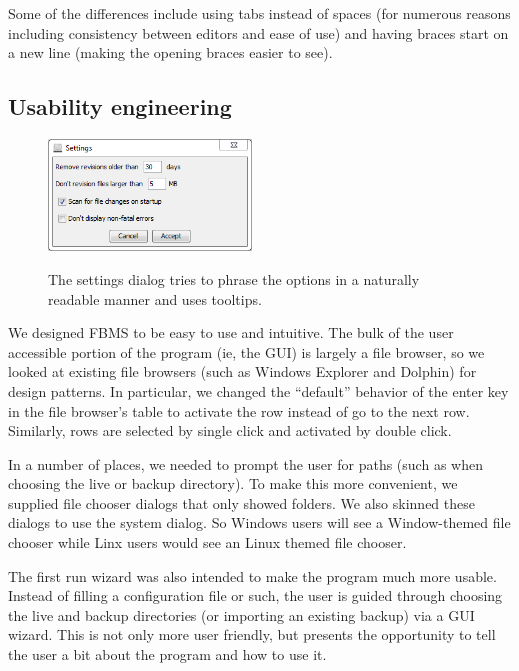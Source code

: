 \documentclass[12pt,a4paper]{article}
\begin{document}
Some of the differences include using tabs instead of spaces (for numerous reasons including consistency between editors and ease of use) and having braces start on a new line (making the opening braces easier to see).

\subsection{Usability engineering}
\begin{figure}
\vspace{-20pt}
\begin{center}
\includegraphics[width=0.48\textwidth]{images/settings.png}
\end{center}
\footnotesize{The settings dialog tries to phrase the options in a naturally readable manner and uses tooltips.}
\end{figure}

We designed FBMS to be easy to use and intuitive. The bulk of the user accessible portion of the program (ie, the GUI) is largely a file browser, so we looked at existing file browsers (such as Windows Explorer\cite{explorer} and Dolphin\cite{dolphin}) for design patterns. In particular, we changed the ``default'' behavior of the enter key in the file browser's table to activate the row instead of go to the next row. Similarly, rows are selected by single click and activated by double click.

In a number of places, we needed to prompt the user for paths (such as when choosing the live or backup directory). To make this more convenient, we supplied file chooser dialogs that only showed folders. We also skinned these dialogs to use the system dialog. So Windows users will see a Window-themed file chooser while Linx users would see an Linux themed file chooser.

The first run wizard was also intended to make the program much more usable. Instead of filling a configuration file or such, the user is guided through choosing the live and backup directories (or importing an existing backup) via a GUI wizard. This is not only more user friendly, but presents the opportunity to tell the user a bit about the program and how to use it.
\end{document}
